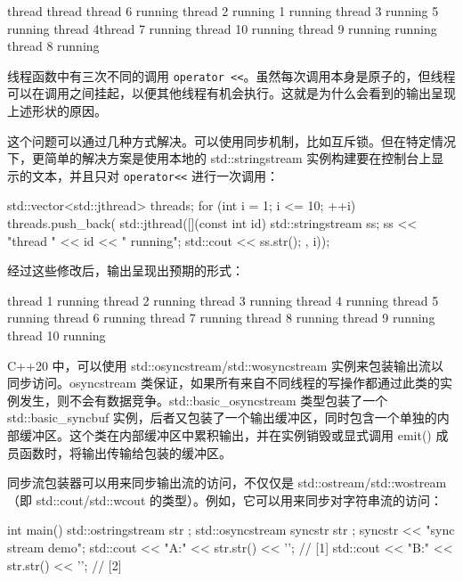 \begin{shell}
thread thread thread 6 running
thread 2 running
1 running
thread 3 running
5 running
thread 4thread 7 running
thread 10 running
thread 9 running
running
thread 8 running
\end{shell}

线程函数中有三次不同的调用 \verb|operator <<|。虽然每次调用本身是原子的，但线程可以在调用之间挂起，以便其他线程有机会执行。这就是为什么会看到的输出呈现上述形状的原因。

这个问题可以通过几种方式解决。可以使用同步机制，比如互斥锁。但在特定情况下，更简单的解决方案是使用本地的 std::stringstream 实例构建要在控制台上显示的文本，并且只对 \verb|operator<<| 进行一次调用：

\begin{cpp}
std::vector<std::jthread> threads;
for (int i = 1; i <= 10; ++i)
{
    threads.push_back(
        std::jthread([](const int id)
            {
                std::stringstream ss;
                ss << "thread " << id << " running\n";
                std::cout << ss.str();
            }, i));
}
\end{cpp}

经过这些修改后，输出呈现出预期的形式：

\begin{shell}
thread 1 running
thread 2 running
thread 3 running
thread 4 running
thread 5 running
thread 6 running
thread 7 running
thread 8 running
thread 9 running
thread 10 running
\end{shell}

C++20 中，可以使用 std::osyncstream/std::wosyncstream 实例来包装输出流以同步访问。osyncstream 类保证，如果所有来自不同线程的写操作都通过此类的实例发生，则不会有数据竞争。std::basic\_osyncstream 类型包装了一个 std::basic\_syncbuf 实例，后者又包装了一个输出缓冲区，同时包含一个单独的内部缓冲区。这个类在内部缓冲区中累积输出，并在实例销毁或显式调用 emit() 成员函数时，将输出传输给包装的缓冲区。

同步流包装器可以用来同步输出流的访问，不仅仅是 std::ostream/std::wostream（即 std::cout/std::wcout 的类型）。例如，它可以用来同步对字符串流的访问：

\begin{cpp}
int main()
{
    std::ostringstream str{ };
    {
        std::osyncstream syncstr{ str };
        syncstr << "sync stream demo";
        std::cout << "A:" << str.str() << '\n'; // [1]
    }
    std::cout << "B:" << str.str() << '\n';    // [2]
}
\end{cpp}


